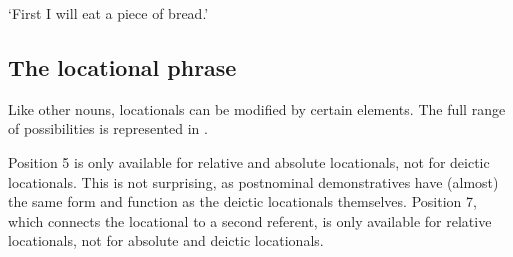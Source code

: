 \glt 
‘First I will eat a piece of bread.’ \textstyleExampleref{[R476.031]}  
\z

\subsection{The locational phrase}\label{sec:3.6.5}
Like other nouns, locationals can be modified by certain  elements. The full range of possibilities is represented in .

\begin{table} 
\caption{Structure of the locational phrase}
\label{tab:16}
\end{table}

Position 5 is only available for relative and absolute locationals, not for deictic locationals. This is not surprising, as postnominal demonstratives have (almost) the same form and function as the deictic locationals themselves. Position 7, which connects the locational to a second referent, is only available for relative locationals, not for absolute and deictic locationals.

